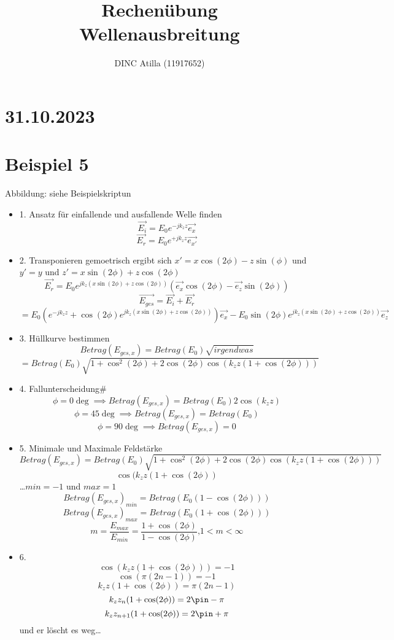 \documentclass[a4paper]{article}
\title{Rechenübung\\Wellenausbreitung}
\author{DINC Atilla (11917652)}
\begin{document}
\normalsize
\maketitle

\section*{31.10.2023}
\section*{Beispiel 5}
Abbildung: siehe Beispielskriptun

\begin{itemize}
    \item 1. Ansatz für einfallende und ausfallende Welle finden
        \[ \vec{E_{i}}=E_{0}e^{-jk_{z}z} \vec{e_{x}} \]
        \[ \vec{E_{r}}=E_{0}e^{+jk_{z}z}\vec{e_{x'}} \]
    \item 2. Transponieren
        gemoetrisch ergibt sich $x'=x\cos(2\phi)-z\sin(\phi)$
        und $y'=y$ 
        und $z'=x\sin(2\phi)+z\cos(2\phi)$
        \[ \vec{E_{r}}=E_{0}e^{jk_{z}(x\sin(2\phi)+z\cos(2\phi))}(\vec{e_{x}}\cos(2\phi)-\vec{e_{z}}\sin(2\phi)) \]
        \[\vec{E_{ges}}=\vec{E_{i}}+\vec{E_{r}} \]
        \[ =E_{0}(e^{-jk_{z}z}+\cos(2\phi)e^{jk_{z}(x\sin(2\phi)+z\cos(2\phi))})\vec{e_{x}}
        -E_{0}\sin(2\phi)e^{jk_{z}(x\sin(2\phi)+z\cos(2\phi))}\vec{e_{z}}\]
    \item 3. Hüllkurve bestimmen
        \[ Betrag(E_{ges,x})=Betrag(E_{0})\sqrt{irgendwas}  \]
        \[ =Betrag(E_{0}) \sqrt{1+\cos^{2}(2\phi) + 2\cos(2\phi)\cos(k_{z}z(1+\cos(2\phi)))} \]
    \item 4. Fallunterscheidung#
        \[ \phi =0\deg \implies Betrag(E_{ges,x})=Betrag(E_{0})2\cos(k_{z}z)  \]
        \[ \phi =45\deg \implies Betrag(E_{ges,x})=Betrag(E_{0})  \]
        \[ \phi =90\deg \implies Betrag(E_{ges,x})=0  \]
    \item 5. Minimale und Maximale Feldstärke
        \[ Betrag(E_{ges,x})=Betrag(E_{0}) \sqrt{1+\cos^{2}(2\phi) + 2\cos(2\phi)\cos(k_{z}z(1+\cos(2\phi)))} \]
        \[\cos(k_{z}z(1+\cos(2\phi))\]
        \ldots $min = -1$ und  $max=1$
        \[ Betrag(E_{ges,x})_{min}=Betrag(E_{0}(1-\cos(2\phi)))\]
        \[ Betrag(E_{ges,x})_{max}=Betrag(E_{0}(1+\cos(2\phi)))\]
        \[ m=\frac{E_{max}}{E_{min}}=\frac{1+\cos(2\phi)}{1-\cos(2\phi)}\text{,} 1 <m < \infty \]
    \item 6.
        \[ \cos(k_{z}z(1+\cos(2\phi)))=-1 \]
        \[ \cos(\pi(2n-1))=-1 \]
        \[ k_{z}z(1+\cos(2\phi))=\pi(2n-1) \]
        \[ k_{z}z_{n}(1+\cos(2\phi))=2\pin-\pi \]
        \[ k_{z}z_{n+1}(1+\cos(2\phi))=2\pin+\pi \]
        und er löscht es weg\ldots
\end{itemize}
\end{document}
